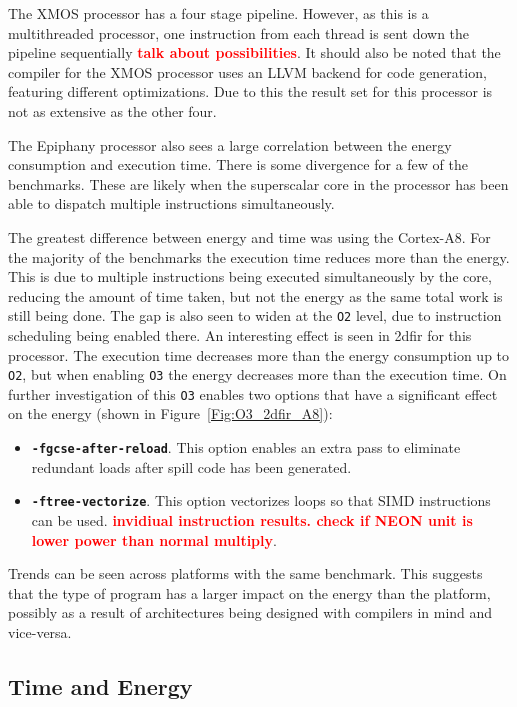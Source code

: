 \documentclass[twocolumn]{article}
\newcommand{\todo}[1]{\textbf{\textcolor{red}{#1}}}
\begin{document}
The XMOS processor has a four stage pipeline. However, as this is a multithreaded processor, one instruction from each thread is sent down the pipeline sequentially \todo{talk about possibilities}. It should also be noted that the compiler for the XMOS processor uses an LLVM backend for code generation, featuring different optimizations. Due to this the result set for this processor is not as extensive as the other four.

The Epiphany processor also sees a large correlation between the energy consumption and execution time. There is some divergence for a few of the benchmarks. These are likely when the superscalar core in the processor has been able to dispatch multiple instructions simultaneously.

The greatest difference between energy and time was using the Cortex-A8. For the majority of the benchmarks the execution time reduces more than the energy. This is due to multiple instructions being executed simultaneously by the core, reducing the amount of time taken, but not the energy as the same total work is still being done. The gap is also seen to widen at the \texttt{O2} level, due to instruction scheduling being enabled there. An interesting effect is seen in 2dfir for this processor. The execution time decreases more than the energy consumption up to \texttt{O2}, but when enabling \texttt{O3} the energy decreases more than the execution time. On further investigation of this \texttt{O3} enables two options that have a significant effect on the energy (shown in Figure~\ref{Fig:O3_2dfir_A8}):
\begin{itemize}
	\item \texttt{\bfseries -fgcse-after-reload}. This option enables an extra pass to eliminate redundant loads after spill code has been generated.
	\item \texttt{\bfseries -ftree-vectorize}. This option vectorizes loops so that SIMD instructions can be used. \todo{invidiual instruction results. check if NEON unit is lower power than normal multiply}.
\end{itemize}

Trends can be seen across platforms with the same benchmark. This suggests that the type of program has a larger impact on the energy than the platform, possibly as a result of architectures being designed with compilers in mind and vice-versa.

\subsection*{Time and Energy}
\end{document}
